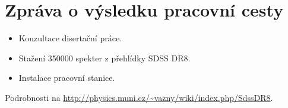 \documentclass{article}
\begin{document}
\title{}
\author{Jaroslav Vážný}


\section*{Zpráva o výsledku pracovní cesty}

\begin{itemize}
\item Konzultace  disertační práce. 
\item Stažení 350000 spekter z přehlídky SDSS DR8. 
\item Instalace pracovní stanice. 
\end{itemize}


\noindent Podrobnosti na \url{http://physics.muni.cz/~vazny/wiki/index.php/SdssDR8}.

\bigskip

\end{document}
